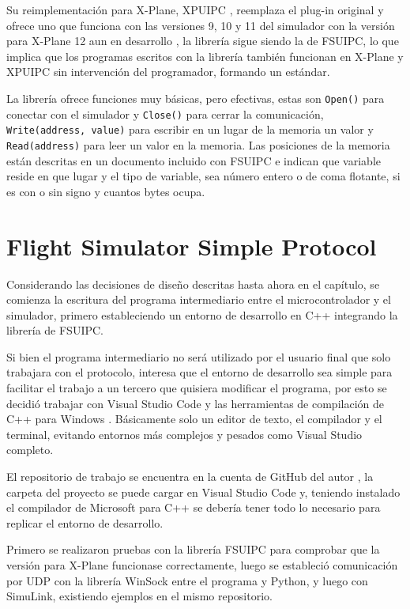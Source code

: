 Su reimplementación para X-Plane, XPUIPC \cite{xpuipc}, reemplaza el plug-in original y ofrece uno que funciona con las versiones 9, 10 y 11 del simulador con la versión para X-Plane 12 aun en desarrollo \cite{xpuipc12}, la librería sigue siendo la de FSUIPC, lo que implica que los programas escritos con la librería también funcionan en X-Plane y XPUIPC sin intervención del programador, formando un estándar.

La librería ofrece funciones muy básicas, pero efectivas, estas son \lstinline{Open()} para conectar con el simulador y \lstinline{Close()} para cerrar la comunicación, \lstinline{Write(address, value)} para escribir en un lugar de la memoria un valor y \lstinline{Read(address)} para leer un valor en la memoria. Las posiciones de la memoria están descritas en un documento incluido con FSUIPC \cite{fsuipcoffsets} e indican que variable reside en que lugar y el tipo de variable, sea número entero o de coma flotante, si es con o sin signo y cuantos bytes ocupa.

\section{Flight Simulator Simple Protocol}

Considerando las decisiones de diseño descritas hasta ahora en el capítulo, se comienza la escritura del programa intermediario entre el microcontrolador y el simulador, primero estableciendo un entorno de desarrollo en C++ integrando la librería de FSUIPC.

Si bien el programa intermediario no será utilizado por el usuario final que solo trabajara con el protocolo, interesa que el entorno de desarrollo sea simple para facilitar el trabajo a un tercero que quisiera modificar el programa, por esto se decidió trabajar con Visual Studio Code \cite{vscode} y las herramientas de compilación de C++ para Windows \cite{msvc}. Básicamente solo un editor de texto, el compilador y el terminal, evitando entornos más complejos y pesados como Visual Studio completo.

El repositorio de trabajo se encuentra en la cuenta de GitHub del autor \cite{fssp}, la carpeta del proyecto se puede cargar en Visual Studio Code y, teniendo instalado el compilador de Microsoft para C++ \cite{msvc} se debería tener todo lo necesario para replicar el entorno de desarrollo.

Primero se realizaron pruebas con la librería FSUIPC para comprobar que la versión para X-Plane funcionase correctamente, luego se estableció comunicación por UDP con la librería WinSock \cite{winsock} entre el programa y Python, y luego con SimuLink, existiendo ejemplos en el mismo repositorio.

